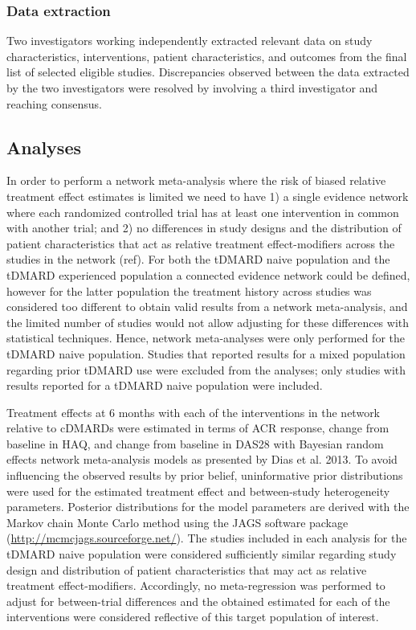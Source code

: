 \documentclass[11pt,final,fleqn]{article}
\theoremstyle{plain}
\begin{document}
\begin{appendices}
\subsubsection{Data extraction}
Two investigators working independently extracted relevant data on study characteristics, interventions, patient characteristics, and outcomes from the final list of selected eligible studies. Discrepancies observed between the data extracted by the two investigators were resolved by involving a third investigator and reaching consensus.

\subsection{Analyses}\label{app:nma-analyses}
In order to perform a network meta-analysis where the risk of biased relative treatment effect estimates is limited we need to have 1) a single evidence network where each randomized controlled trial has at least one intervention in common with another trial; and 2) no differences in study designs and the distribution of patient characteristics that act as relative treatment effect-modifiers across the studies in the network (ref). For both the tDMARD naive population and the tDMARD experienced population a connected evidence network could be defined, however for the latter population the treatment history across studies was considered too different to obtain valid results from a network meta-analysis, and the limited number of studies would not allow adjusting for these differences with statistical techniques. Hence, network meta-analyses were only performed for the tDMARD naive population. Studies that reported results for a mixed population regarding prior tDMARD use were excluded from the analyses; only studies with results reported for a tDMARD naive population were included. 

Treatment effects at 6 months with each of the interventions in the network relative to cDMARDs were estimated in terms of ACR response, change from baseline in HAQ, and change from baseline in DAS28 with Bayesian random effects network meta-analysis models as presented by Dias et al. 2013. To avoid influencing the observed results by prior belief, uninformative prior distributions were used for the estimated treatment effect and between-study heterogeneity parameters. Posterior distributions for the model parameters are derived with the Markov chain Monte Carlo method using the JAGS software package (\url{http://mcmcjags.sourceforge.net/}). The studies included in each analysis for the tDMARD naive population were considered sufficiently similar regarding study design and distribution of patient characteristics that may act as relative treatment effect-modifiers. Accordingly, no meta-regression was performed to adjust for between-trial differences and the obtained estimated for each of the interventions were considered reflective of this target population of interest. 


\end{appendices}
\end{document}
